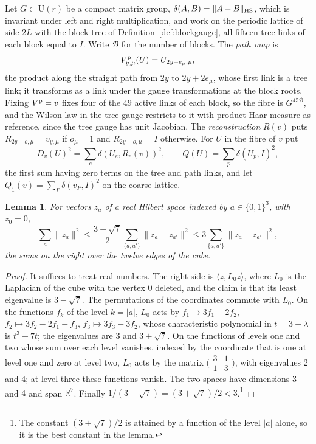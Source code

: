 \documentclass[11pt]{amsart}
\newtheorem{lemma}[theorem]{Lemma}
\theoremstyle{definition}
\theoremstyle{remark}
\numberwithin{equation}{section}
\newcommand{\R}{\mathbb{R}}
\newcommand{\U}{\mathrm{U}}
\newcommand{\ip}[2]{\langle #1,#2\rangle}
\begin{document}
Let $G\subset\U(r)$ be a compact matrix group, $\delta(A,B)=\lVert A-B
\rVert_{\rm HS}$, which is invariant under left and right multiplication,
and work on the periodic lattice of side $2L$ with the block tree of
Definition~\ref{def:blockgauge}, all fifteen tree links of each block equal
to $I$. Write $\mathcal B$ for the number of blocks. The \emph{path map} is
\[
V^{\rm p}_{y,\mu}(U)=U_{2y+e_\mu,\mu},
\]
the product along the straight path from $2y$ to $2y+2e_\mu$, whose first
link is a tree link; it transforms as a link under the gauge
transformations at the block roots. Fixing $V^{\rm p}=v$ fixes four of the
$49$ active links of each block, so the fibre is $G^{45\mathcal B}$, and
the Wilson law in the tree gauge restricts to it with product Haar measure
as reference, since the tree gauge has unit Jacobian. The
\emph{reconstruction} $R(v)$ puts $R_{2y+o,\mu}=v_{y,\mu}$ if $o_\mu=1$ and
$R_{2y+o,\mu}=I$ otherwise. For $U$ in the fibre of $v$ put
\[
D_v(U)^2=\sum_e\delta(U_e,R_e(v))^2,\qquad Q(U)=\sum_p\delta(U_p,I)^2,
\]
the first sum having zero terms on the tree and path links, and let
$Q_1(v)=\sum_P\delta(v_P,I)^2$ on the coarse lattice.

\begin{lemma}\label{lem:anchorcube}
For vectors $z_a$ of a real Hilbert space indexed by $a\in\{0,1\}^3$, with
$z_0=0$,
\[
\sum_a\lVert z_a\rVert^2\le\frac{3+\sqrt7}2\sum_{\{a,a'\}}\lVert z_a-
z_{a'}\rVert^2\le3\sum_{\{a,a'\}}\lVert z_a-z_{a'}\rVert^2,
\]
the sums on the right over the twelve edges of the cube.
\end{lemma}

\begin{proof}
It suffices to treat real numbers. The right side is $\ip z{L_0z}$, where
$L_0$ is the Laplacian of the cube with the vertex $0$ deleted, and the
claim is that its least eigenvalue is $3-\sqrt7$. The permutations of the
coordinates commute with $L_0$. On the functions $f_k$ of the level $k=
|a|$, $L_0$ acts by $f_1\mapsto3f_1-2f_2$, $f_2\mapsto3f_2-2f_1-f_3$,
$f_3\mapsto3f_3-3f_2$, whose characteristic polynomial in $t=3-\lambda$ is
$t^3-7t$; the eigenvalues are $3$ and $3\pm\sqrt7$. On the functions of
levels one and two whose sum over each level vanishes, indexed by the
coordinate that is one at level one and zero at level two, $L_0$ acts by
the matrix $\bigl(\begin{smallmatrix}3&1\\1&3\end{smallmatrix}\bigr)$, with
eigenvalues $2$ and $4$; at level three these functions vanish. The two
spaces have dimensions $3$ and $4$ and span $\R^7$. Finally $1/(3-\sqrt7)=
(3+\sqrt7)/2<3$.\footnote{The constant $(3+\sqrt7)/2$ is attained by a
function of the level $|a|$ alone, so it is the best constant in the
lemma.}
\end{proof}
\end{document}
